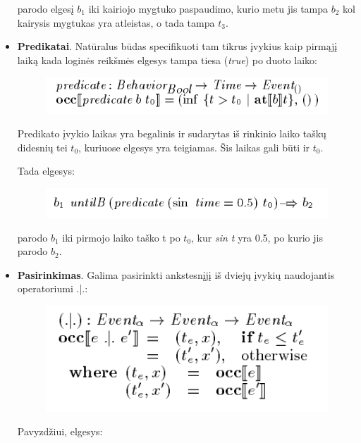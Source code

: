 \begin{itemize}
	parodo elgesį \(b_{1}\) iki kairiojo mygtuko paspaudimo, kurio metu jis tampa \(b_{2}\) kol kairysis mygtukas yra atleistas, o tada tampa \(t_{3}\).

	\item \textbf{Predikatai}. Natūralus būdas specifikuoti tam tikrus įvykius kaip pirmąjį laiką kada loginės reikšmės elgesys tampa tiesa (\textit{true}) po duoto laiko:

\begin{figure}[H]
	\centering
	\includegraphics[scale=0.75]{pics/7.png}
	\label{pic:7}
\end{figure}

	Predikato įvykio laikas yra begalinis ir sudarytas iš rinkinio laiko taškų didesnių tei \(t_{0}\), kuriuose elgesys yra teigiamas. Šis laikas gali būti ir \(t_{0}\).

	Tada elgesys:

\begin{figure}[H]
	\centering
	\includegraphics[scale=0.75]{pics/8.png}
	\label{pic:8}
\end{figure}

 	parodo \(b_{1}\) iki pirmojo laiko taško t po \(t_{0}\), kur \textit{sin t} yra 0.5, po kurio jis parodo \(b_{2}\).

 	\item \textbf{Pasirinkimas}. Galima pasirinkti ankstesnįjį iš dviejų įvykių naudojantis operatoriumi .|.:

\begin{figure}[H]
	\centering
	\includegraphics[scale=0.75]{pics/9.png}
	\label{pic:9}
\end{figure}

	Pavyzdžiui, elgesys:


\end{itemize}
